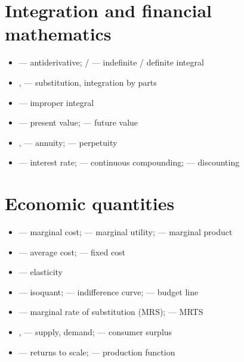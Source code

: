\section*{Integration and financial mathematics}

\begin{itemize}[leftmargin=1.4em,itemsep=0.15ex]
  \item {} --- antiderivative;
         /  --- indefinite /
        definite integral
  \item {},  --- substitution,
        integration by parts
  \item {} --- improper integral
  \item {} --- present value;  --- future value
  \item {},  --- annuity;  ---
        perpetuity
  \item {} --- interest rate;  ---
        continuous compounding;  --- discounting
\end{itemize}

\section*{Economic quantities}

\begin{itemize}[leftmargin=1.4em,itemsep=0.15ex]
  \item {} --- marginal cost;  --- marginal
        utility;  --- marginal product
  \item {} --- average cost;  ---
        fixed cost
  \item {} --- elasticity
  \item {} --- isoquant;  ---
        indifference curve;  --- budget line
  \item {} --- marginal rate of substitution
        (MRS);  --- MRTS
  \item {},  --- supply, demand;
         --- consumer surplus
  \item {} --- returns to scale;
         --- production function
\end{itemize}
